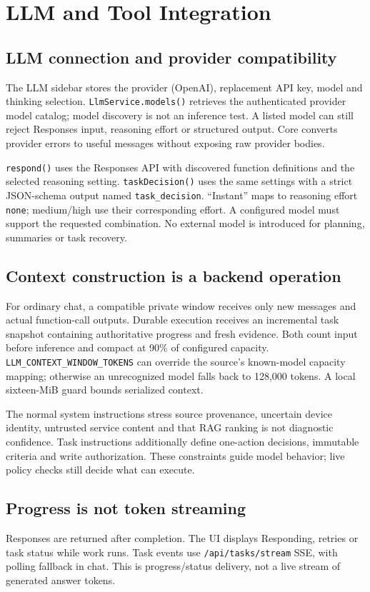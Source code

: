 \chapter{LLM and Tool Integration}
\section{LLM connection and provider compatibility}
The LLM sidebar stores the provider (OpenAI), replacement API key, model and thinking selection. \texttt{LlmService.models()} retrieves the authenticated provider model catalog; model discovery is not an inference test. A listed model can still reject Responses input, reasoning effort or structured output. Core converts provider errors to useful messages without exposing raw provider bodies.

\texttt{respond()} uses the Responses API with discovered function definitions and the selected reasoning setting. \texttt{taskDecision()} uses the same settings with a strict JSON-schema output named \texttt{task\_decision}. ``Instant'' maps to reasoning effort \texttt{none}; medium/high use their corresponding effort. A configured model must support the requested combination. No external model is introduced for planning, summaries or task recovery.
\section{Context construction is a backend operation}
For ordinary chat, a compatible private window receives only new messages and actual function-call outputs. Durable execution receives an incremental task snapshot containing authoritative progress and fresh evidence. Both count input before inference and compact at 90\% of configured capacity. \texttt{LLM\_CONTEXT\_WINDOW\_TOKENS} can override the source's known-model capacity mapping; otherwise an unrecognized model falls back to 128,000 tokens. A local sixteen-MiB guard bounds serialized context.

The normal system instructions stress source provenance, uncertain device identity, untrusted service content and that RAG ranking is not diagnostic confidence. Task instructions additionally define one-action decisions, immutable criteria and write authorization. These constraints guide model behavior; live policy checks still decide what can execute.
\section{Progress is not token streaming}
Responses are returned after completion. The UI displays Responding, retries or task status while work runs. Task events use \texttt{/api/tasks/stream} SSE, with polling fallback in chat. This is progress/status delivery, not a live stream of generated answer tokens.

